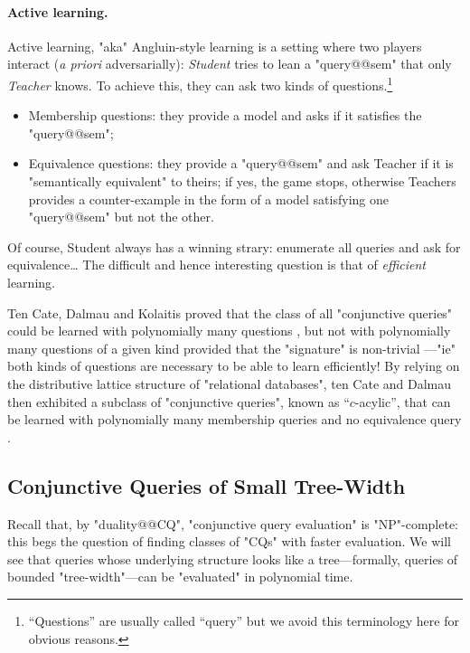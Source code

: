 \paragraph*{Active learning.}
Active learning, "aka" Angluin-style learning is a setting where
two players interact (\emph{a priori} adversarially): \emph{Student} tries
to lean a "query@@sem" that only \emph{Teacher} knows. To achieve this,
they can ask two kinds of questions.\footnote{``Questions'' are usually called 
``query'' but we avoid this terminology here for obvious reasons.}
\begin{itemize}
	\item Membership questions: they provide a model and asks if it satisfies the "query@@sem";
	\item Equivalence questions: they provide a "query@@sem" and ask Teacher if
		it is "semantically equivalent" to theirs; if yes, the game stops, otherwise
		Teachers provides a counter-example in the form of a model satisfying
		one "query@@sem" but not the other.
\end{itemize}
Of course, Student always has a winning strary: enumerate all queries
and ask for equivalence… The difficult and hence interesting question
is that of \emph{efficient} learning.

Ten Cate, Dalmau and Kolaitis proved that 
the class of all "conjunctive queries" could be
learned with polynomially many questions \cite[Theorem~A]{tenCateDalmauKolaitis2013Learning},
but not with polynomially many questions of a given kind provided
that the "signature" is non-trivial \cite[Theorem~B]{tenCateDalmauKolaitis2013Learning}---"ie"
both kinds of questions are necessary to be able to learn efficiently!
By relying on the distributive lattice structure of "relational databases",
ten Cate and Dalmau then exhibited a subclass of "conjunctive queries",
known as ``$c$-acylic'', that can be learned with
polynomially many membership queries
and no equivalence query \cite[Theorem~5.2]{tenCateDalmau2021ActiveLearning}.


\subsection{Conjunctive Queries of Small Tree-Width}
\AP\label{sec:prelim-db-tw}

Recall that, by "duality@@CQ", "conjunctive query evaluation" is "NP"-complete:
this begs the question of finding classes of "CQs" with faster evaluation.
We will see that queries whose underlying structure looks like
a tree---formally, queries of bounded "tree-width"---can be "evaluated" in polynomial time.

